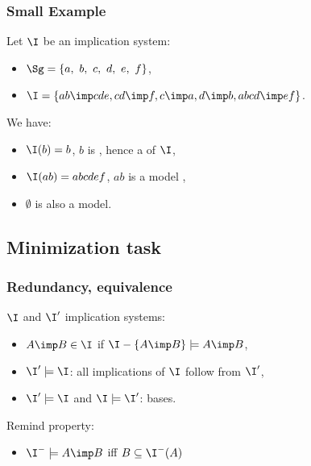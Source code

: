 \begin{frame}
\frametitle{Small Example}

Let $\I$ be an implication system:
\begin{itemize}
	\item $\Sg = \{ a, \ b, \ c, \ d, \ e, \ f \}$,
	\item $\I = \{ ab \imp cde, cd \imp f, c \imp a, d \imp b, abcd \imp ef \}$.
\end{itemize}

\vspace{1.2em}

We have:
\begin{itemize}
	\item $\I(b) = b$, $b$ is , hence a  of $\I$,
	\item $\I(ab) = abcdef$, $ab$ is  a model \quad 
	,
	\item $\emptyset$ is also a model.
\end{itemize}

\end{frame}



\subsection{Minimization task}

\begin{frame}
\frametitle{Redundancy, equivalence}

$\I$ and $\I'$ implication systems:
\begin{itemize}
	\item $A \imp B \in \I$  if $\I - \{A \imp B\} \models A \imp B$,
	\item $\I' \models \I$: all implications of $\I$ follow from $\I'$,
	\item $\I' \models \I$ and $\I \models \I'$:  bases.
\end{itemize}

\vspace{1.2em}

\begin{lightreminder}
	Remind property: 
	\begin{itemize}
		\item $\I^{-} \models A \imp B$ iff $B \subseteq \I^{-}(A)$
	\end{itemize}
\end{lightreminder}

\end{frame}

